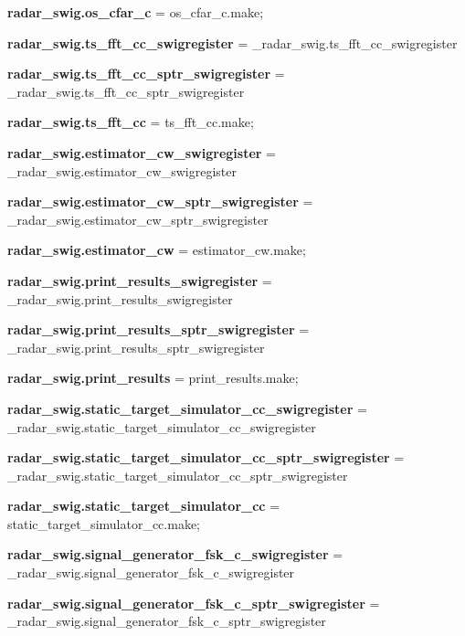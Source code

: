 \begin{DoxyCompactItemize}
\item 
{\bf radar\+\_\+swig.\+os\+\_\+cfar\+\_\+c} = os\+\_\+cfar\+\_\+c.\+make;
\item 
{\bf radar\+\_\+swig.\+ts\+\_\+fft\+\_\+cc\+\_\+swigregister} = \+\_\+radar\+\_\+swig.\+ts\+\_\+fft\+\_\+cc\+\_\+swigregister
\item 
{\bf radar\+\_\+swig.\+ts\+\_\+fft\+\_\+cc\+\_\+sptr\+\_\+swigregister} = \+\_\+radar\+\_\+swig.\+ts\+\_\+fft\+\_\+cc\+\_\+sptr\+\_\+swigregister
\item 
{\bf radar\+\_\+swig.\+ts\+\_\+fft\+\_\+cc} = ts\+\_\+fft\+\_\+cc.\+make;
\item 
{\bf radar\+\_\+swig.\+estimator\+\_\+cw\+\_\+swigregister} = \+\_\+radar\+\_\+swig.\+estimator\+\_\+cw\+\_\+swigregister
\item 
{\bf radar\+\_\+swig.\+estimator\+\_\+cw\+\_\+sptr\+\_\+swigregister} = \+\_\+radar\+\_\+swig.\+estimator\+\_\+cw\+\_\+sptr\+\_\+swigregister
\item 
{\bf radar\+\_\+swig.\+estimator\+\_\+cw} = estimator\+\_\+cw.\+make;
\item 
{\bf radar\+\_\+swig.\+print\+\_\+results\+\_\+swigregister} = \+\_\+radar\+\_\+swig.\+print\+\_\+results\+\_\+swigregister
\item 
{\bf radar\+\_\+swig.\+print\+\_\+results\+\_\+sptr\+\_\+swigregister} = \+\_\+radar\+\_\+swig.\+print\+\_\+results\+\_\+sptr\+\_\+swigregister
\item 
{\bf radar\+\_\+swig.\+print\+\_\+results} = print\+\_\+results.\+make;
\item 
{\bf radar\+\_\+swig.\+static\+\_\+target\+\_\+simulator\+\_\+cc\+\_\+swigregister} = \+\_\+radar\+\_\+swig.\+static\+\_\+target\+\_\+simulator\+\_\+cc\+\_\+swigregister
\item 
{\bf radar\+\_\+swig.\+static\+\_\+target\+\_\+simulator\+\_\+cc\+\_\+sptr\+\_\+swigregister} = \+\_\+radar\+\_\+swig.\+static\+\_\+target\+\_\+simulator\+\_\+cc\+\_\+sptr\+\_\+swigregister
\item 
{\bf radar\+\_\+swig.\+static\+\_\+target\+\_\+simulator\+\_\+cc} = static\+\_\+target\+\_\+simulator\+\_\+cc.\+make;
\item 
{\bf radar\+\_\+swig.\+signal\+\_\+generator\+\_\+fsk\+\_\+c\+\_\+swigregister} = \+\_\+radar\+\_\+swig.\+signal\+\_\+generator\+\_\+fsk\+\_\+c\+\_\+swigregister
\item 
{\bf radar\+\_\+swig.\+signal\+\_\+generator\+\_\+fsk\+\_\+c\+\_\+sptr\+\_\+swigregister} = \+\_\+radar\+\_\+swig.\+signal\+\_\+generator\+\_\+fsk\+\_\+c\+\_\+sptr\+\_\+swigregister

\end{DoxyCompactItemize}
